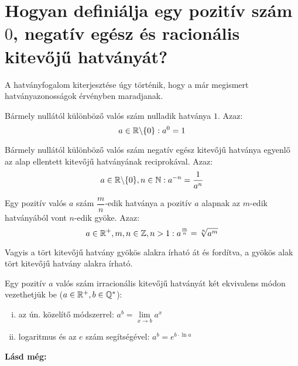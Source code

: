 
\section{Hogyan definiálja egy pozitív szám \texorpdfstring{$0$}{0}, negatív
  egész és racionális kitevőjű hatványát?}

A hatványfogalom kiterjesztése úgy történik, hogy a már megismert
hatványazonosságok érvényben maradjanak.

\begin{defin}
Bármely nullától különböző valós szám nulladik hatványa $1$. Azaz:
\[
  a \in \mathbb{R} \backslash \{0\}: a^0 = 1
\]
\end{defin}

\begin{defin}
Bármely nullától különböző valós szám negatív egész kitevőjű hatványa egyenlő
az alap ellentett kitevőjű hatványának reciprokával. Azaz:
\[
  a \in \mathbb{R} \backslash \{0\}, n \in \mathbb{N}: a^{-n} = \dfrac{1}{a^n}
\]
\end{defin}

\begin{defin}
Egy pozitív valós $a$ szám $\dfrac{m}{n}$-edik hatványa a pozitív $a$ alapnak
az $m$-edik hatványából vont $n$-edik gyöke. Azaz:
\[
  a \in \mathbb{R}^+, m, n \in \mathbb{Z}, n > 1: a^{\frac{m}{n}} = \sqrt[n]{a^m}
\]

Vagyis a tört kitevőjű hatvány gyökös alakra írható át és fordítva, a gyökös
alak tört kitevőjű hatvány alakra írható.
\end{defin}

\begin{defin4}
Egy pozitív $a$ valós szám irracionális kitevőjű hatványát két ekvivalens módon
vezethetjük be ($a \in \mathbb{R}^+, b \in \mathbb{Q^*}$):
\begin{enumerate}[i)]
\item az ún. közelítő módszerrel: $a^b = \lim\limits_{x \to b} a^x$
\item logaritmus és az $e$ szám segítségével: $a^b = e^{b \cdot \ln a}$
\end{enumerate}
\end{defin4}

\textbf{Lásd még:}

